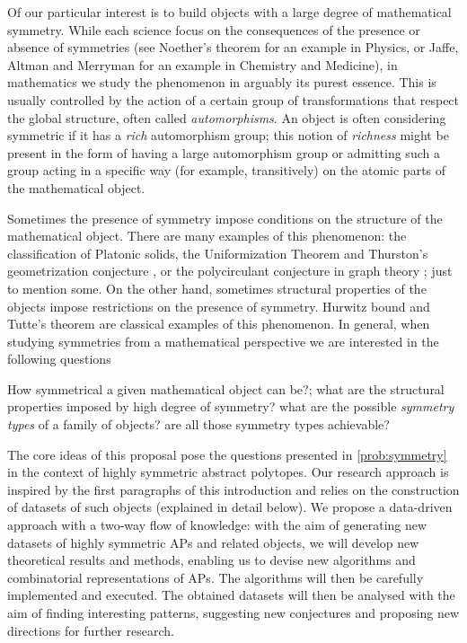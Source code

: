 Of our particular interest is to build objects with a large degree of mathematical symmetry.
While each science focus on the consequences of the presence or absence of symmetries (see Noether's theorem \cite{Noether1918_InvarianteVariationsprobleme} for an example in Physics, or Jaffe, Altman and Merryman \cite*{JaffAltMer1964_AntipyridoxineEffectPenicillamine} for an example in Chemistry and Medicine), in mathematics we study the phenomenon in arguably its purest essence. 
This is usually controlled by the action of a certain group of transformations that respect the global structure, often called \emph{automorphisms}. 
An object is often considering symmetric if it has a \emph{rich} automorphism group; this notion of \emph{richness} might be present in the form of having a large automorphism group or admitting such a group acting in a specific way (for example, transitively) on the atomic parts of the mathematical object. 

Sometimes the presence of symmetry impose conditions on the structure of the mathematical object.
There are many examples of this phenomenon: the classification of Platonic solids, the Uniformization Theorem \cite{Abikoff1981_UniformizationTheorem} and Thurston's geometrization conjecture \cite{Thurston1982_ThreeDimensionalManifolds}, or the polycirculant conjecture in graph theory \cite{Marusic1981_VertexSymmetricDigraphs}; just to mention some.
On the other hand, sometimes structural properties of the objects impose restrictions on the presence of symmetry.
Hurwitz bound \cite{Hurwitz1892_UeberAlgebraischeGebilde} and Tutte's theorem \cite{Tutte1959_SymmetryCubicGraphs} are classical examples of this phenomenon.
In general, when studying symmetries from a mathematical perspective we are interested in the following questions

\begin{problem}\label{prob:symmetry}
  How symmetrical a given mathematical object can be?; what are the  structural properties imposed by high degree of symmetry? what are the possible \emph{symmetry types} of a family of objects? are all those symmetry types achievable?
\end{problem}

The core ideas of this proposal pose the questions presented in \cref{prob:symmetry} in the context of highly symmetric abstract polytopes. Our research approach is inspired by the first paragraphs of this introduction and relies on the construction of datasets of such objects (explained in detail below).
We propose a data-driven approach with a two-way flow of knowledge: with the aim of generating new datasets of highly symmetric APs and related objects, we will develop new theoretical results and methods, enabling us to devise new algorithms and combinatorial representations of APs. The algorithms will then be carefully implemented and executed.
The obtained datasets will then be analysed with the aim of finding interesting patterns, suggesting new conjectures and proposing new directions for further research.





